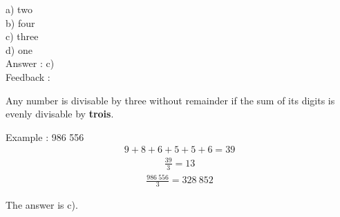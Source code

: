 \documentclass[letterpaper, 12pt]{article}
\begin{document}
a) two\\
b) four\\
c) three\\
d) one\\

Answer : c)\\

Feedback :
\begin{center}
Any number is divisable by three without remainder if the sum of its digits is evenly divisable by \textbf{trois}.\\
\end{center}

Example : 986 556\\
\begin{eqnarray*}
9+8+6+5+5+6 = 39
\end{eqnarray*}
\begin{eqnarray*}
\frac{39}{3}=13
\end{eqnarray*}
\begin{eqnarray*}
\frac{986\ 556}{3}= 328\ 852
\end{eqnarray*}

The answer is c).\\
\end{document}
